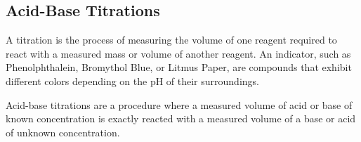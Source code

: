 \subsection{Acid-Base Titrations}

\begin{defn}
A titration is the process of measuring the volume of one reagent required to react with a measured mass or volume of another reagent. An indicator, such as Phenolphthalein, Bromythol Blue, or Litmus Paper, are compounds that exhibit different colors depending on the pH of their surroundings. 
\end{defn}

\begin{defn}
Acid-base titrations are a procedure where a measured volume of acid or base of known concentration is exactly reacted with a measured volume of a base or acid of unknown concentration.
\end{defn}

